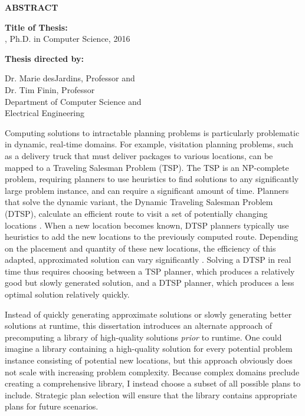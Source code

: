 \newpage
\pagestyle{empty}

\begin{center}
\vspace{0.1in}
\large{\bf ABSTRACT} \par  
\bigskip \bigskip
\end{center}

\begin{flushleft}
{\bf Title of Thesis:} \thesistitle{}\\
\fullname{}, Ph.D. in Computer Science, 2016 \\
\begin{singlespace}
{\bf Thesis directed by:}{\hspace{2.5mm}} \parbox[t]{3in}{Dr. Marie desJardins, Professor and \\ Dr. Tim Finin, Professor \\
Department of Computer Science and \\ Electrical Engineering}
\end{singlespace}
\end{flushleft}


Computing solutions to intractable planning problems is particularly problematic in dynamic, real-time domains.  For example, visitation planning problems, such as a delivery truck that must deliver packages to various locations, can be mapped to a Traveling Salesman Problem (TSP).  The TSP is an NP-complete problem, requiring planners to use heuristics to find solutions to any significantly large problem instance, and can require a significant amount of time.  Planners that solve the dynamic variant, the Dynamic Traveling Salesman Problem (DTSP), calculate an efficient route to visit a set of potentially changing locations \citep{psaraftis88dynamic}.  When a new location becomes known, DTSP planners typically use heuristics to add the new locations to the previously computed route.  Depending on the placement and quantity of these new locations, the efficiency of this adapted, approximated solution can vary significantly \citep{psaraftis95dynamic,laporte00classical,larsen2000dvrp}.  Solving a DTSP in real time thus requires choosing between a TSP planner, which produces a relatively good but slowly generated solution, and a DTSP planner, which produces a less optimal solution relatively quickly.

Instead of quickly generating approximate solutions or slowly generating better solutions at runtime, this dissertation introduces an alternate approach of precomputing a library of high-quality solutions \textit{prior} to runtime.  One could imagine a library containing a high-quality solution for every potential problem instance consisting of potential new locations, but this approach obviously does not scale with increasing problem complexity.  Because complex domains preclude creating a comprehensive library, I instead choose a subset of all possible plans to include. Strategic plan selection will ensure that the library contains appropriate plans for future scenarios.

